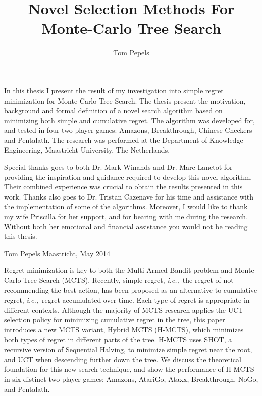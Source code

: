 \documentclass{kecsmstr}
\title{Novel Selection Methods For Monte-Carlo Tree Search}
\author{Tom Pepels}
\newcommand{\ie}{{\it i.e.,}~}
\begin{document}
\makeheaders {} \maketitle \setcounter{page}{2}
\emptypage

In this thesis I present the result of my investigation into simple regret minimization for Monte-Carlo Tree Search. The thesis present the motivation, background and formal definition of a novel search algorithm based on minimizing both simple and cumulative regret. The algorithm was developed for, and tested in four two-player games: Amazons, Breakthrough, Chinese Checkers and Pentalath. The research was performed at the Department of Knowledge Engineering, Maastricht University, The Netherlands.

Special thanks goes to both Dr. Mark Winands and Dr. Marc Lanctot for providing the inspiration and guidance required to develop this novel algorithm. Their combined experience was crucial to obtain the results presented in this work. Thanks also goes to Dr. Tristan Cazenave for his time and assistance with the implementation of some of the algorithms. Moreover, I would like to thank my wife Priscilla for her support, and for  bearing with me during the research. Without both her emotional and financial assistance you would not be reading this thesis.
\newline \newline

\noindent Tom Pepels \newline
Maastricht, May 2014
\emptypage

 Regret minimization is key to both the Multi-Armed Bandit problem and Monte-Carlo Tree Search (MCTS). Recently, simple regret, \ie the regret of not recommending the best action, has been proposed as an alternative to cumulative regret, \ie regret accumulated over time. Each type of regret is appropriate in different contexts. Although the majority of MCTS research applies the UCT selection policy for minimizing cumulative regret in the tree, this paper introduces a new MCTS variant, Hybrid MCTS (H-MCTS), which minimizes both types of regret in different parts of the tree. H-MCTS uses SHOT, a recursive version of Sequential Halving, to minimize simple regret near the root, and UCT when descending further down the tree. We discuss the theoretical foundation for this new search technique, and show the performance of H-MCTS in six distinct two-player games: Amazons, AtariGo, Ataxx, Breakthrough, NoGo, and Pentalath. \emptypage
\end{document}
